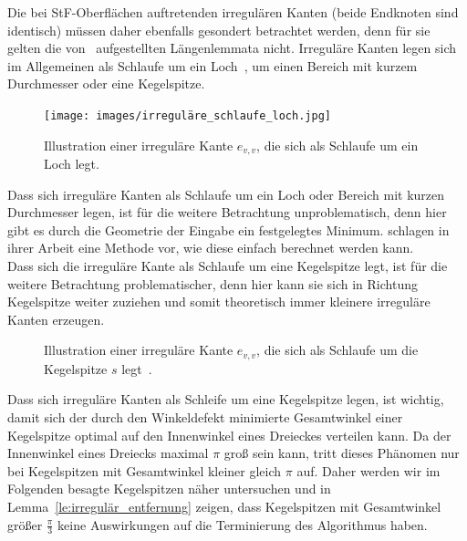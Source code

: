 Die bei StF-Oberflächen auftretenden irregulären Kanten (beide Endknoten sind identisch) müssen daher ebenfalls gesondert betrachtet werden, denn für sie gelten die von~\citet{ruppert:1995:delaunay} aufgestellten Längenlemmata nicht. Irreguläre Kanten legen sich im Allgemeinen als Schlaufe um ein Loch~\cite{erickson:2005:generator}, um einen Bereich mit kurzem Durchmesser oder eine Kegelspitze.\\
 \begin{figure}[H]
    \centering
    \texttt{[image: images/irreguläre\_schlaufe\_loch.jpg]}
    \caption{Illustration einer  irreguläre Kante $e_{v,v}$, die sich als Schlaufe um ein Loch legt.}%
    \label{fig:irreguläre_schlaufe}
\end{figure}
 


Dass sich irreguläre Kanten als Schlaufe um ein Loch oder Bereich mit kurzen Durchmesser legen, ist für die weitere Betrachtung unproblematisch, denn hier gibt es durch die Geometrie der Eingabe ein festgelegtes Minimum.  \citet{erickson:2005:generator}  schlagen in ihrer Arbeit eine Methode vor, wie diese einfach berechnet werden kann.\\
Dass sich die irreguläre Kante als Schlaufe um eine Kegelspitze legt, ist für die weitere Betrachtung problematischer, denn hier kann sie sich in Richtung Kegelspitze  weiter zuziehen und somit theoretisch immer kleinere irreguläre Kanten erzeugen.
 \begin{figure}[H]
    \centering
    
    \caption{Illustration einer  irreguläre Kante $e_{v,v}$, die sich als Schlaufe um die Kegelspitze $s$ legt~\cite{erickson:2005:generator}.}%
    \label{fig:irraegular_kegel}
\end{figure}
 
Dass sich irreguläre Kanten als Schleife um eine Kegelspitze legen, ist wichtig, damit sich der durch den Winkeldefekt minimierte Gesamtwinkel einer Kegelspitze optimal auf den Innenwinkel eines Dreieckes verteilen kann. Da der Innenwinkel eines Dreiecks maximal $\pi$ groß sein kann, tritt dieses Phänomen nur bei Kegelspitzen mit Gesamtwinkel kleiner gleich $\pi$ auf. Daher werden wir im Folgenden besagte Kegelspitzen näher untersuchen und in Lemma~\ref{le:irregulär_entfernung} zeigen, dass Kegelspitzen mit Gesamtwinkel größer $\frac{\pi}{3}$ keine Auswirkungen auf die Terminierung des Algorithmus haben. 








